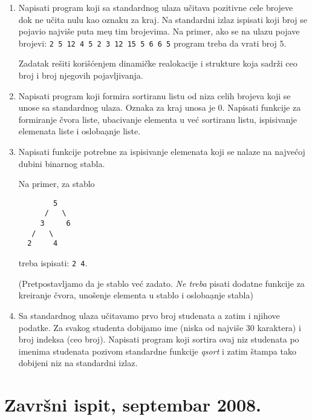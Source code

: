 \begin{enumerate}

\item
Napisati program koji sa standardnog ulaza u\v citava pozitivne cele
brojeve dok ne u\v cita nulu kao oznaku za kraj. Na standardni izlaz
ispisati koji broj se pojavio najvi\v se puta me\d u tim brojevima.
Na primer, ako se na ulazu pojave brojevi:
\verb+2 5 12 4 5 2 3 12 15 5 6 6 5+
program treba da vrati broj $5$.

Zadatak re\v siti kori\v{s}\'cenjem dinami\v cke realokacije i strukture
koja sadr\v zi ceo broj i broj njegovih pojavljivanja.

\item
Napisati program koji formira sortiranu listu od niza celih brojeva koji se
unose sa standardnog ulaza. Oznaka za kraj unosa je $0$. Napisati funkcije za
formiranje \v cvora liste, ubacivanje elementa u ve\' c sortiranu listu,
ispisivanje elemenata liste i osloba\d anje liste.


\item Napisati funkcije potrebne za ispisivanje elemenata koji se nalaze
na najve\' coj dubini binarnog stabla.

Na primer, za stablo

\begin{minipage}[t]{120mm}
\begin{verbatim}
        5
      /   \
     3     6
   /   \
  2     4
\end{verbatim}
\end{minipage}

\noindent
treba ispisati: {\tt 2 4}.

(Pretpostavljamo da je stablo ve\' c zadato. \emph{Ne treba} pisati dodatne
funkcije za kreiranje \v cvora, uno\v senje elementa u stablo i
osloba\d anje stabla)


\item
Sa standardnog ulaza u\v citavamo prvo broj studenata a zatim i
njihove podatke. Za svakog studenta dobijamo ime (niska od najvi\v se
30 karaktera) i broj indeksa (ceo broj). Napisati program koji
sortira ovaj niz studenata po imenima studenata pozivom standardne
funkcije \emph{qsort} i zatim \v stampa tako dobijeni niz na standardni
izlaz.
\end{enumerate}



\section{Zavr\v{s}ni ispit, septembar 2008.}




